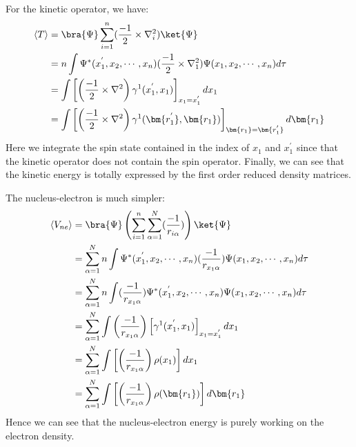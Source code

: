 For the kinetic operator, we have:
\begin{align}\label{DMeq:4}
  \langle T\rangle &=
  \bra{\Psi}\sum_{i=1}^{n}(\frac{-1}{2}\times\nabla_{i}^2)\ket{\Psi}
  \nonumber \\
  &=n\int \Psi^{*}(x^{'}_{1}, x_{2}, \cdots,
  x_{n})(\frac{-1}{2}\times\nabla_{1}^2)\Psi(x_{1}, x_{2}, \cdots,
  x_{n})d\tau \nonumber \\
  &=\int \left[\left(\frac{-1}{2}\times\nabla^2\right)
    \gamma^{1}(x^{'}_{1}, x_{1})\right]_{x_{1} = x_{1}^{'}} dx_{1}
  \nonumber \\
  &=\int \left[\left(\frac{-1}{2}\times\nabla^2\right)
    \gamma^{1}(\bm{r^{'}_{1}}, \bm{r_{1}})\right]_{\bm{r_{1}} =
    \bm{r_{1}^{'}}}d\bm{r_{1}}
\end{align}
Here we integrate the spin state contained in the index of $x_{1}$ and
$x^{'}_{1}$ since that the kinetic operator does not contain the spin
operator. Finally, we can see that the kinetic energy is totally
expressed by the first order reduced density matrices.

The nucleus-electron is much simpler:
\begin{align}\label{DMeq:5}
  \langle V_{ne}\rangle &=
  \bra{\Psi}\left(\sum_{i=1}^{n}\sum_{\alpha=1}^{N}(\frac{-1}{r_{i\alpha}}
    )\right)\ket{\Psi}
  \nonumber \\
  &=\sum_{\alpha=1}^{N} n\int \Psi^{*}(x^{'}_{1}, x_{2}, \cdots,
  x_{n})(\frac{-1}{r_{x_{1}\alpha}})\Psi(x_{1}, x_{2}, \cdots,
  x_{n})d\tau \nonumber \\
  &=\sum_{\alpha=1}^{N} n\int
  (\frac{-1}{r_{x_{1}\alpha}})\Psi^{*}(x^{'}_{1}, x_{2}, \cdots,
  x_{n})\Psi(x_{1}, x_{2}, \cdots,
  x_{n})d\tau \nonumber \\
  &=\sum_{\alpha=1}^{N}\int
  \left(\frac{-1}{r_{x_{1}\alpha}}\right)\left[ \gamma^{1}(x^{'}_{1},
    x_{1})\right]_{x_{1} = x_{1}^{'}} dx_{1}
  \nonumber \\
  &=\sum_{\alpha=1}^{N}\int
  \left[\left(\frac{-1}{r_{x_{1}\alpha}}\right) \rho(x_{1})\right]
  dx_{1} \nonumber \\
  &=\sum_{\alpha=1}^{N}\int
  \left[\left(\frac{-1}{r_{x_{1}\alpha}}\right) \rho(\bm{r_{1}})\right]
  d\bm{r_{1}}
\end{align}
Hence we can see that the nucleus-electron energy is purely working on
the electron density.

